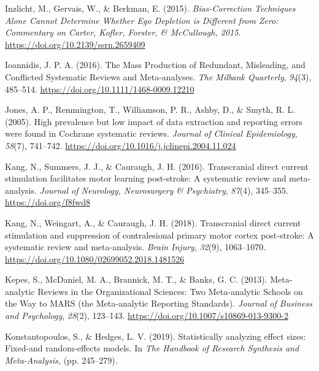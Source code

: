 \documentclass[
  man,floatsintext]{apa6}
\newlength{\cslhangindent}
\newlength{\cslentryspacingunit} %
\newenvironment{CSLReferences}[2] %
 {%
  \setlength{\parindent}{0pt}
  \ifodd #1
  \let\oldpar\par
  \def\par{\hangindent=\cslhangindent\oldpar}
  \fi
  \setlength{\parskip}{#2\cslentryspacingunit}
 }%
 {}
\begin{document}
\begin{CSLReferences}{1}{0}
\leavevmode{}%
Inzlicht, M., Gervais, W., \& Berkman, E. (2015). \emph{Bias-{Correction Techniques Alone Cannot Determine Whether Ego Depletion} is {Different} from {Zero}: {Commentary} on {Carter}, {Kofler}, {Forster}, \& {McCullough}, 2015}. \url{https://doi.org/10.2139/ssrn.2659409}

\leavevmode{}%
Ioannidis, J. P. A. (2016). The {Mass Production} of {Redundant}, {Misleading}, and {Conflicted Systematic Reviews} and {Meta-analyses}. \emph{The Milbank Quarterly}, \emph{94}(3), 485--514. \url{https://doi.org/10.1111/1468-0009.12210}

\leavevmode{}%
Jones, A. P., Remmington, T., Williamson, P. R., Ashby, D., \& Smyth, R. L. (2005). High prevalence but low impact of data extraction and reporting errors were found in {Cochrane} systematic reviews. \emph{Journal of Clinical Epidemiology}, \emph{58}(7), 741--742. \url{https://doi.org/10.1016/j.jclinepi.2004.11.024}

\leavevmode{}%
Kang, N., Summers, J. J., \& Cauraugh, J. H. (2016). Transcranial direct current stimulation facilitates motor learning post-stroke: A systematic review and meta-analysis. \emph{Journal of Neurology, Neurosurgery \& Psychiatry}, \emph{87}(4), 345--355. \url{https://doi.org/f8fwd8}

\leavevmode{}%
Kang, N., Weingart, A., \& Cauraugh, J. H. (2018). Transcranial direct current stimulation and suppression of contralesional primary motor cortex post-stroke: A systematic review and meta-analysis. \emph{Brain Injury}, \emph{32}(9), 1063--1070. \url{https://doi.org/10.1080/02699052.2018.1481526}

\leavevmode{}%
Kepes, S., McDaniel, M. A., Brannick, M. T., \& Banks, G. C. (2013). Meta-analytic {Reviews} in the {Organizational Sciences}: {Two Meta-analytic Schools} on the {Way} to {MARS} (the {Meta-analytic Reporting Standards}). \emph{Journal of Business and Psychology}, \emph{28}(2), 123--143. \url{https://doi.org/10.1007/s10869-013-9300-2}

\leavevmode{}%
Konstantopoulos, S., \& Hedges, L. V. (2019). Statistically analyzing effect sizes: {Fixed-and} random-effects models. In \emph{The {Handbook} of {Research Synthesis} and {Meta-Analysis},} (pp. 245--279).


\end{CSLReferences}
\end{document}
